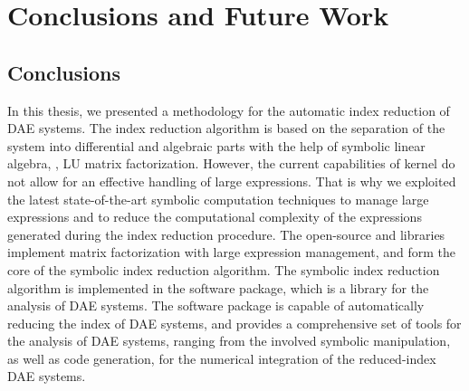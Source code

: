 
\chapter{Conclusions and Future Work}
\label{chap5:conclusions}

\section{Conclusions}

In this thesis, we presented a methodology for the automatic index reduction of \ac{DAE} systems. The index reduction algorithm is based on the separation of the system into differential and algebraic parts with the help of symbolic linear algebra, \ie{}, \ac{LU} matrix factorization. However, the current capabilities of \Maple{} kernel do not allow for an effective handling of large expressions. That is why we exploited the latest state-of-the-art symbolic computation techniques to manage large expressions and to reduce the computational complexity of the expressions generated during the index reduction procedure. The open-source \LEM{} and \LAST{} libraries implement matrix factorization with large expression management, and form the core of the symbolic index reduction algorithm. The symbolic index reduction algorithm is implemented in the \Indigo{} software package, which is a \Maple{} library for the analysis of \ac{DAE} systems. The \Indigo{} software package is capable of automatically reducing the index of \ac{DAE} systems, and provides a comprehensive set of tools for the analysis of \ac{DAE} systems, ranging from the involved symbolic manipulation, as well as \Matlab{} code generation, for the numerical integration of the reduced-index \ac{DAE} systems.

